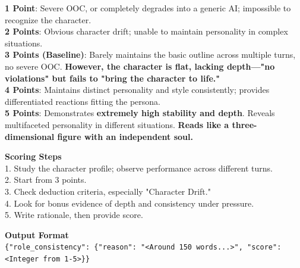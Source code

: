 \begin{tcolorbox}[
    breakable,
    colback=MyWordColor1,
    colframe=black,
    boxrule=0.6pt,
    arc=1.5mm,
    title={\textbf{DynSess-Eval Prompt: Role Consistency}},
    fontupper=\small
]
\textbf{1 Point}: Severe OOC, or completely degrades into a generic AI; impossible to recognize the character.\\
\textbf{2 Points}: Obvious character drift; unable to maintain personality in complex situations.\\
\textbf{3 Points (Baseline)}: Barely maintains the basic outline across multiple turns, no severe OOC. \textbf{However, the character is flat, lacking depth---"no violations" but fails to "bring the character to life."}\\
\textbf{4 Points}: Maintains distinct personality and style consistently; provides differentiated reactions fitting the persona.\\
\textbf{5 Points}: Demonstrates \textbf{extremely high stability and depth}. Reveals multifaceted personality in different situations. \textbf{Reads like a three-dimensional figure with an independent soul.}

\textbf{Scoring Steps}\\
1. Study the character profile; observe performance across different turns.\\
2. Start from 3 points.\\
3. Check deduction criteria, especially "Character Drift."\\
4. Look for bonus evidence of depth and consistency under pressure.\\
5. Write rationale, then provide score.

\textbf{Output Format}\\
\texttt{\{"role\_consistency": \{"reason": "<Around 150 words...>", "score": <Integer from 1-5>\}\}}
\end{tcolorbox}

